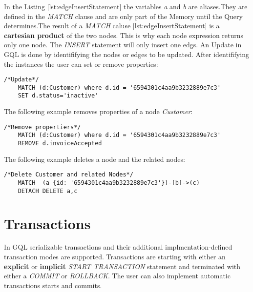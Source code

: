 In the Listing \ref{lst:edgeInsertStatement} the variables \textit{a} and \textit{b} are
aliases.\newline They are defined in the \textit{MATCH} clause and are only part of the Memory until
the Query determines.\newline The result of a \textit{MATCH} caluse \ref{lst:edgeInsertStatement} is a \textbf{cartesian product} of the two nodes.
This is why each node expression returns only one node. The \textit{INSERT} statement will only insert one edgs.\newline
An Update in GQL is done by identififying the nodes or edges to be updated.
After identififying the instances the user can set or remove properties:
\begin{lstlisting}[caption={Update statements in GQL}, label={lst:updateStatement}] 
	/*Update*/
	MATCH (d:Customer) where d.id = '6594301c4aa9b3232889e7c3'
	SET d.status='inactive'
\end{lstlisting}
The following example removes properties of a node \textit{Customer}:
\begin{lstlisting}[caption={Delete propteries in GQL}, label={lst:removeStatement}] 
	/*Remove propertiers*/
	MATCH (d:Customer) where d.id = '6594301c4aa9b3232889e7c3'
	REMOVE d.invoiceAccepted
\end{lstlisting}
The following example deletes a node and the related nodes:
\begin{lstlisting}[caption={Remove nodes and in GQL}, label={lst:deleteStatement}] 
	/*Delete Customer and related Nodes*/
	MATCH  (a {id: '6594301c4aa9b3232889e7c3'})-[b]->(c)
	DETACH DELETE a,c
\end{lstlisting}
\section{Transactions}
\label{sec:iso:transactions}
In GQL serializable transactions and their additional implmentation-defined transaction modes 
are supported.
Transactions are starting with either an \textbf{explicit} or \textbf{implicit} \textit{START TRANSACTION}
statement and terminated with either a \textit{COMMIT} or \textit{ROLLBACK}.
The user can also  implement automatic transactions starts and commits.



